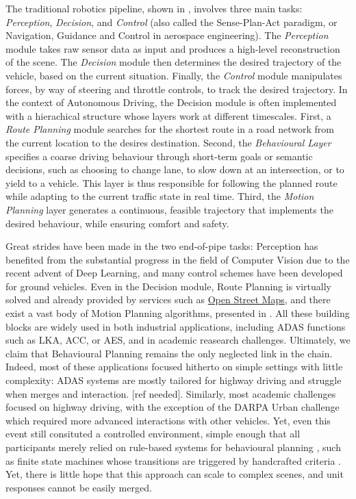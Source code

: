 The traditional robotics pipeline, shown in , involves three main tasks: \emph{Perception}, \emph{Decision}, and \emph{Control} (also called the Sense-Plan-Act paradigm, or Navigation, Guidance and Control in aerospace engineering). The \emph{Perception} module takes raw sensor data as input and produces a high-level reconstruction of the scene. The \emph{Decision} module then determines the desired trajectory of the vehicle, based on the current situation. Finally, the \emph{Control} module manipulates forces, by way of steering and throttle controls, to track the desired trajectory. In the context of Autonomous Driving, the Decision module is often implemented with a hierachical structure whose layers work at different timescales. First, a \emph{Route Planning} module searches for the shortest route in a road network from the current location to the desires destination. Second, the \emph{Behavioural Layer} specifies a coarse driving behaviour through short-term goals or semantic decisions, such as choosing to change lane, to slow down at an intersection, or to yield to a vehicle. This layer is thus responsible for following the planned route while adapting to the current traffic state in real time. Third, the \emph{Motion Planning} layer generates a continuous, feasible trajectory that implements the desired behaviour, while ensuring comfort and safety.

Great strides have been made in the two end-of-pipe tasks: Perception has benefited from the substantial progress in the field of Computer Vision due to the recent advent of Deep Learning, and many control schemes \citep[surveyed in][]{Polack2018} have been developed for ground vehicles. Even in the Decision module, Route Planning is virtually solved and already provided by services such as \href{https://wiki.openstreetmap.org/wiki/Routing}{Open Street Maps}, and there exist a vast body of Motion Planning algorithms, presented in . All these building blocks are widely used in both industrial applications, including ADAS functions such as LKA, ACC, or AES, and in academic reasearch challenges. Ultimately, we claim that Behavioural Planning remains the only neglected link in the chain. Indeed, most of these applications focused hitherto on simple settings with little complexity: ADAS systems are mostly tailored for highway driving and struggle when merges and interaction. [ref needed]. Similarly, most academic challenges focused on highway driving, with the exception of the DARPA Urban challenge which required more advanced interactions with other vehicles. Yet, even this event still consituted a controlled environment, simple enough that all participants merely relied on rule-based systems for behavioural planning \citep{Buehler2009}, such as finite state machines whose transitions are triggered by handcrafted criteria \citep[\eg][]{Baker2008}. Yet, there is little hope that this approach can scale to complex scenes, and unit responses cannot be easily merged.

